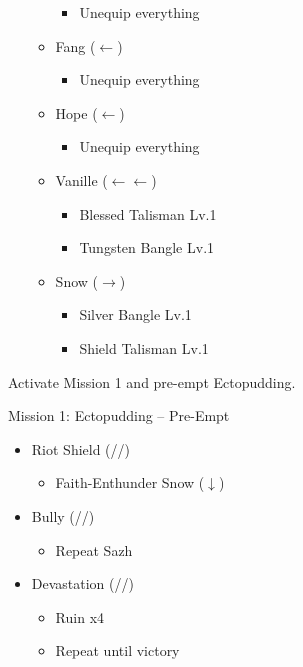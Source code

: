 \begin{menu}
\begin{itemize}
\begin{itemize}
				\begin{itemize}
					\item Unequip everything
				\end{itemize}
			\item Fang ($\leftarrow$)
				\begin{itemize}
					\item Unequip everything
				\end{itemize}
			\item Hope ($\leftarrow$)
				\begin{itemize}
					\item Unequip everything
				\end{itemize}
			\item Vanille ($\leftarrow\leftarrow$)
			      \begin{itemize}
				      \item Blessed Talisman Lv.1
				      \item Tungsten Bangle Lv.1
			      \end{itemize}
			\item Snow ($\rightarrow$)
			      \begin{itemize}
				      \item Silver Bangle Lv.1
				      \item Shield Talisman Lv.1
			      \end{itemize}
		\end{itemize}
	\end{itemize}
\end{menu}

Activate Mission 1 and pre-empt Ectopudding.

\renewcommand{\first}{[1] Solidarity (\com/\med/\sen)}
\renewcommand{\second}{[2] Delta Attack (\com/\rav/\sen)}
\renewcommand{\third}{[3] Riot Shield (\syn/\rav/\sen)}
\renewcommand{\fourth}{[4] Bully (\syn/\sab/\com)}
\renewcommand{\fifth}{[5] Devastation (\com/\sab/\com)}
\renewcommand{\sixth}{[6] Dirty Fighting (\com/\sab/\sen)}

\begin{battle}{Mission 1: Ectopudding -- Pre-Empt}
	\begin{itemize}
		\item \third
			\begin{itemize}
				\item Faith-Enthunder Snow ($\downarrow$)
			\end{itemize}
		\item \fourth
			\begin{itemize}
				\item Repeat Sazh
			\end{itemize}
		\item \fifth
			\begin{itemize}
				\item Ruin x4
				\item Repeat until victory
			\end{itemize}
	\end{itemize}
\end{battle}

